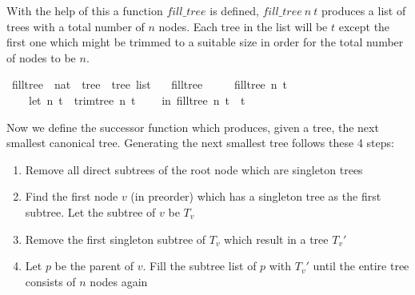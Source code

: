 With the help of this a function $fill\_tree$ is defined, $fill\_tree\ n\ t$ produces a list of trees with a total number of $n$ nodes.
Each tree in the list will be $t$ except the first one which might be trimmed to a suitable size in order for the total number of nodes to be $n$.

\begin{isabellebox}
    \isamarkupfalse%
\ fill{\isacharunderscore}{\kern0pt}tree\ {\isacharcolon}{\kern0pt}{\isacharcolon}{\kern0pt}\ {\isachardoublequoteopen}nat\ {\isasymRightarrow}\ tree\ {\isasymRightarrow}\ tree\ list{\isachardoublequoteclose}\ \isanewline
\ \ {\isachardoublequoteopen}fill{\isacharunderscore}{\kern0pt}tree\ {}\ {\isacharunderscore}{\kern0pt}\ {\isacharequal}{\kern0pt}\ {\isacharbrackleft}{\kern0pt}{\isacharbrackright}{\kern0pt}{\isachardoublequoteclose}\isanewline
{\isacharbar}{\kern0pt}\ {\isachardoublequoteopen}fill{\isacharunderscore}{\kern0pt}tree\ n\ t\ {\isacharequal}{\kern0pt}\isanewline
\ \ \ \ {\isacharparenleft}{\kern0pt}let\ {\isacharparenleft}{\kern0pt}n{\isacharprime}{\kern0pt}{\isacharcomma}{\kern0pt}\ t{\isacharprime}{\kern0pt}{\isacharparenright}{\kern0pt}\ {\isacharequal}{\kern0pt}\ trim{\isacharunderscore}{\kern0pt}tree\ n\ t\isanewline
\ \ \ \ in\ fill{\isacharunderscore}{\kern0pt}tree\ n{\isacharprime}{\kern0pt}\ t{\isacharprime}{\kern0pt}\ {\isacharat}{\kern0pt}\ {\isacharbrackleft}{\kern0pt}t{\isacharprime}{\kern0pt}{\isacharbrackright}{\kern0pt}{\isacharparenright}{\kern0pt}{\isachardoublequoteclose}
\end{isabellebox}

Now we define the successor function which produces, given a tree, the next smallest canonical tree.
Generating the next smallest tree follows these 4 steps:

\begin{enumerate}
    \item Remove all direct subtrees of the root node which are singleton trees
    \item Find the first node $v$ (in preorder) which has a singleton tree as the first subtree. Let the subtree of $v$ be $T_v$
    \item Remove the first singleton subtree of $T_v$ which result in a tree $T_v'$
    \item Let $p$ be the parent of $v$. Fill the subtree list of $p$ with $T_v'$ until the entire tree consists of $n$ nodes again
\end{enumerate}


